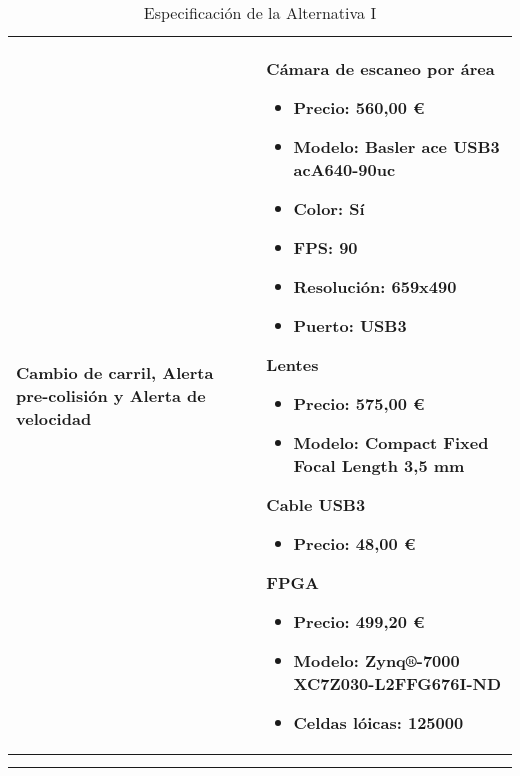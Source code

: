 \begin{center}
\begin{longtable}{p{5cm} p{8cm}}
\\ \hline

\textbf{Cambio de carril, Alerta pre-colisión y Alerta de velocidad} &
Cámara de escaneo por área
\begin{itemize}
    \item Precio: 560,00 \euro
    \item Modelo: Basler ace USB3 acA640-90uc
    \item Color: Sí
    \item FPS: 90
    \item Resolución: 659x490
    \item Puerto: USB3
\end{itemize}
Lentes
\begin{itemize}
    \item Precio: 575,00 \euro
    \item Modelo: Compact Fixed Focal Length 3,5 mm
\end{itemize}
Cable USB3
\begin{itemize}
    \item Precio: 48,00 \euro
\end{itemize}
FPGA
\begin{itemize}
    \item Precio: 499,20 \euro
    \item Modelo: Zynq®-7000 XC7Z030-L2FFG676I-ND
    \item Celdas lóicas: 125000
\end{itemize}
\\ \hline
\caption{Especificación de la Alternativa I}\\
\label{tab:altI}
\end{longtable}
\end{center}
